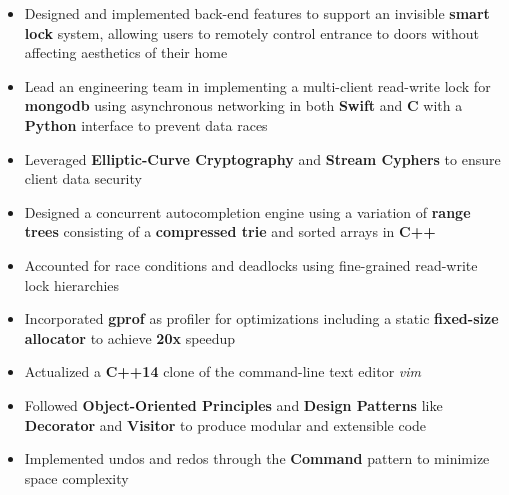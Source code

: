 \documentclass[10pt,a4paper,ragged2e]{altacv}
\begin{document}
\divider

\begin{itemize}
    \item Designed and implemented back-end features to support an invisible \textbf{smart lock} system,
        allowing users to remotely control entrance to doors without affecting aesthetics of their home
    \item Lead an engineering team in implementing a multi-client read-write lock for \textbf{mongodb} using asynchronous networking in both \textbf{Swift} and \textbf{C} with a \textbf{Python} interface to prevent data races
    \item Leveraged \textbf{Elliptic-Curve Cryptography} and \textbf{Stream Cyphers} to ensure client data security
\end{itemize}


\begin{itemize}
    \item Designed a concurrent autocompletion engine using a variation of \textbf{range trees} consisting of a \textbf{compressed trie} and sorted arrays in \textbf{C++}
    \item Accounted for race conditions and deadlocks using fine-grained read-write lock hierarchies
    \item Incorporated \textbf{gprof} as profiler for optimizations including a static \textbf{fixed-size allocator} to achieve \textbf{20x} speedup
\end{itemize}

\divider

\begin{itemize}
    \item Actualized a \textbf{C++14} clone of the command-line text editor \textit{vim}
    \item Followed \textbf{Object-Oriented Principles} and \textbf{Design Patterns} like \textbf{Decorator} and \textbf{Visitor} to produce modular and extensible code
    \item Implemented undos and redos through the \textbf{Command} pattern to minimize space complexity
\end{itemize}
\end{document}
